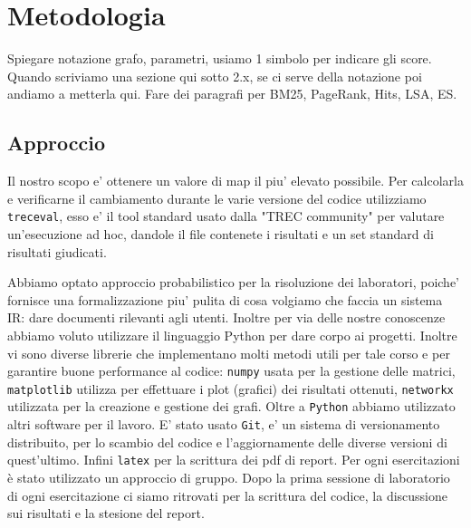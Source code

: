 \section{Metodologia}
\label{sec:metodologia}

Spiegare notazione grafo, parametri, usiamo 1 simbolo per indicare gli score. Quando scriviamo una sezione qui sotto 2.x, se ci serve della notazione poi andiamo a metterla qui. 
Fare dei paragrafi per BM25, PageRank, Hits, LSA, ES.


\subsection{Approccio}
\label{sec:approccio}

Il nostro scopo e' ottenere un valore di map il piu' elevato possibile. Per calcolarla e verificarne il cambiamento durante le varie versione del codice utilizziamo \texttt{treceval}, esso e' il tool standard usato dalla "TREC community" per valutare un'esecuzione ad hoc, dandole il file contenete i risultati e un set standard di risultati giudicati.  

Abbiamo optato approccio probabilistico per la risoluzione dei laboratori, poiche' fornisce una formalizzazione piu' pulita di cosa volgiamo che faccia un sistema IR: dare documenti rilevanti agli utenti. 
Inoltre per via delle nostre conoscenze abbiamo voluto utilizzare il linguaggio Python per dare corpo ai progetti. Inoltre vi sono diverse librerie che implementano molti metodi utili per tale corso e per garantire buone performance al codice: \texttt{numpy} usata per la gestione delle matrici, \texttt{matplotlib} utilizza per effettuare i plot (grafici) dei risultati ottenuti, \texttt{networkx} utilizzata per la creazione e gestione dei grafi.
Oltre a \texttt{Python} abbiamo utilizzato altri software per il lavoro. E' stato usato \texttt{Git}, e' un sistema di versionamento distribuito, per lo scambio del codice e l'aggiornamente delle diverse versioni di quest'ultimo. Infini \texttt{latex} per la scrittura dei pdf di report.
Per ogni esercitazioni è stato utilizzato un approccio di gruppo. Dopo la prima sessione di laboratorio di ogni esercitazione ci siamo ritrovati per la scrittura del codice, la discussione sui risultati e la stesione del report.

